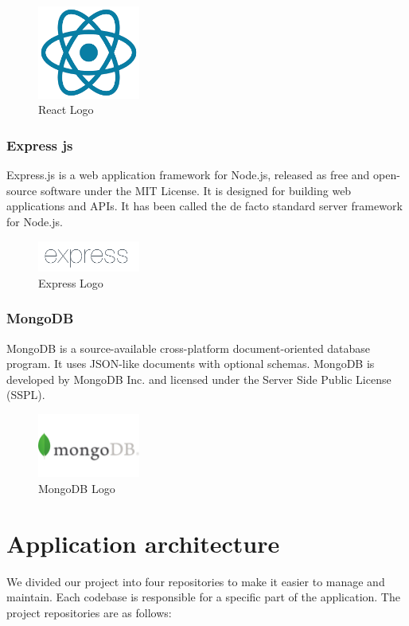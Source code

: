 \begin{figure}[h!]
      \centering
      \includegraphics[width=0.3\textwidth]{images/reactjs.png}
      \caption{React Logo}
      \label{fig:react}
\end{figure}

\subsubsection{Express js}
Express.js is a web application framework for Node.js, released as free
and open-source software under the MIT License. It is designed for building
web applications and APIs. It has been called the de facto standard server framework for Node.js.

\begin{figure}[h!]
      \centering
      \includegraphics[width=0.3\textwidth]{images/Expressjs.png}
      \caption{Express Logo}
      \label{fig:express}
\end{figure}

\subsubsection{MongoDB}
MongoDB is a source-available cross-platform document-oriented database program.
It uses JSON-like documents with optional schemas. MongoDB is developed by
MongoDB Inc. and licensed under the Server Side Public License (SSPL).
\begin{figure}[h!]
      \centering
      \includegraphics[width=0.3\textwidth]{images/mongodb.png}
      \caption{MongoDB Logo}
      \label{fig:mongodb}
\end{figure}
\bigbreak
\section{Application architecture}
We divided our project into four repositories to make it easier to manage and
maintain. Each codebase is responsible for a specific part of the application.
The project repositories are as follows:

